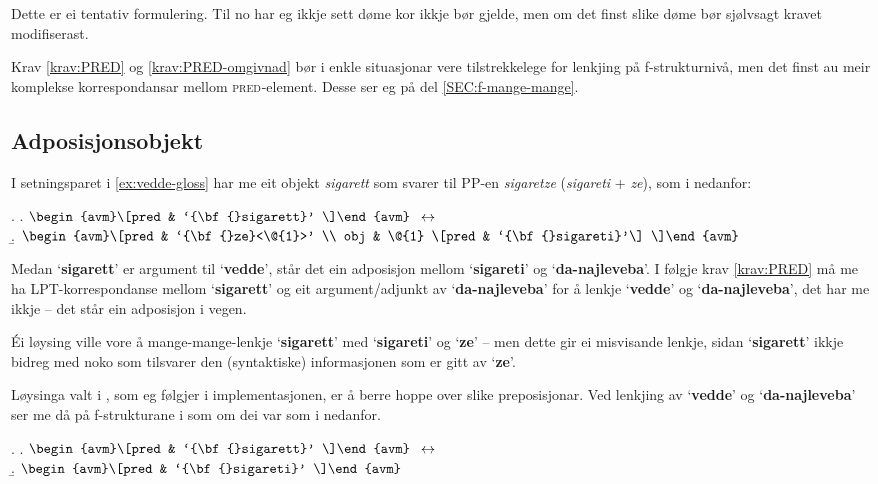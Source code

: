 \documentclass[11pt,a4paper,oneside,draft]{book}
\newcommand{\F}[2]{\textsc{#1}\ensuremath{_{#2}}}
\newcommand{\PRED}{\F{pred}{}}
\newcommand{\p}[1]{`\textbf{#1}'}
\begin{document}
Dette er ei tentativ formulering. Til no har eg ikkje sett døme kor
\Last ikkje bør gjelde, men om det finst slike døme bør sjølvsagt
kravet modifiserast.

Krav \ref{krav:PRED} og \ref{krav:PRED-omgivnad} bør i enkle
situasjonar vere tilstrekkelege for lenkjing på f-strukturnivå, men
det finst au meir komplekse korrespondansar mellom \PRED{}-element. Desse
ser eg på del \ref{SEC:f-mange-mange}.


\subsection{Adposisjonsobjekt}
\label{sec-3.6.4}

\label{SEC:adposisjonsobjekt}

 I setningsparet i \ref{ex:vedde-gloss} har me eit objekt \emph{sigarett}
 som svarer til PP-en \emph{sigaretze} (\emph{sigareti} + \emph{ze}), som i \Next
 nedanfor:

{\avmoptions{}
\ex. \a. $\begin{avm}\[pred & `{\bf{}sigarett}' \]\end{avm}\\$
     $\\\leftrightarrow$\\
     \b.     $\begin{avm}\[pred & `{\bf{}ze}<\@{1}>' \\
                 obj & \@{1} \[pred & `{\bf{}sigareti}'\] \]\end{avm}$

}

 Medan \p{sigarett} er argument til \p{vedde}, står det ein adposisjon
 mellom \p{sigareti} og \p{da-najleveba}. I følgje krav
 \ref{krav:PRED} må me ha LPT-korrespondanse mellom \p{sigarett} og
 eit argument/adjunkt av \p{da-najleveba} for å lenkje \p{vedde} og
 \p{da-najleveba}, det har me ikkje -- det står ein adposisjon i vegen.

 Éi løysing ville vore å mange-mange-lenkje \p{sigarett} med
 \p{sigareti} og \p{ze} -- men dette gir ei misvisande lenkje, sidan
 \p{sigarett} ikkje bidreg med noko som tilsvarer den (syntaktiske)
 informasjonen som er gitt av \p{ze}. 

 Løysinga valt i \citet[s.~75,~fotnote~3]{dyvik2009lmp}, som eg
 følgjer i implementasjonen, er å berre hoppe over slike
 preposisjonar. Ved lenkjing av \p{vedde} og \p{da-najleveba} ser me
 då på f-strukturane i \Last som om dei var som i \Next nedanfor.

{\avmoptions{}
\ex. \a. $\begin{avm}\[pred & `{\bf{}sigarett}' \]\end{avm}\\$
     $\\\leftrightarrow$\\
     \b.     $\begin{avm}\[pred & `{\bf{}sigareti}' \]\end{avm}$

}
\end{document}
